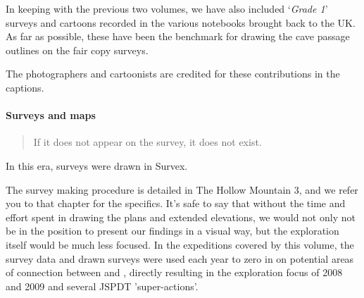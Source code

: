\begin{tcolorbox}
\begin{fullwidth}
\begin{multicols}{2}
 			In keeping with the previous two volumes, we have also included `\textit{Grade 1}' surveys and cartoons recorded in the various notebooks brought back to the UK. As far as possible, these have been the benchmark for drawing the cave passage outlines on the fair copy surveys. 

 			The photographers and cartoonists are credited for these contributions in the captions.


 			\paragraph{Surveys and maps}

 			\begin{quote}If it does not appear on the survey, it does not exist. 
 			\end{quote}
 			In this era, surveys were drawn in Survex.
    
    The survey making procedure is detailed in The Hollow Mountain 3, and we refer you to that chapter for the specifics. It's safe to say that without the time and effort spent in drawing the plans and extended elevations, we would not only not be in the position to present our findings in a visual way, but the exploration itself would be much less focused. In the expeditions covered by this volume, the survey data and drawn surveys were used each year to zero in on potential areas of connection between  and , directly resulting in the exploration focus of 2008 and 2009 and several JSPDT 'super-actions'.



 		\end{multicols}
 	\end{fullwidth}
 \end{tcolorbox}


